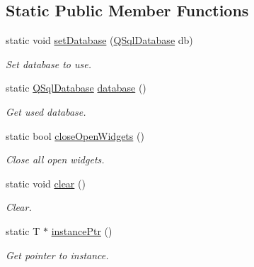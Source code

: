 \subsection*{Static Public Member Functions}
\begin{DoxyCompactItemize}
\item 
static void \hyperlink{classmdt_sql_application_widgets_affa03f524f089c58627adaf009b34333}{set\-Database} (\hyperlink{class_q_sql_database}{Q\-Sql\-Database} db)
\begin{DoxyCompactList}\small\item\em Set database to use. \end{DoxyCompactList}\item 
static \hyperlink{class_q_sql_database}{Q\-Sql\-Database} \hyperlink{classmdt_sql_application_widgets_a0eadaf7f2fdc32ef0b5e8a2cb0954126}{database} ()
\begin{DoxyCompactList}\small\item\em Get used database. \end{DoxyCompactList}\item 
static bool \hyperlink{classmdt_sql_application_widgets_a8084af5be11b7660a007e1d784252877}{close\-Open\-Widgets} ()
\begin{DoxyCompactList}\small\item\em Close all open widgets. \end{DoxyCompactList}\item 
static void \hyperlink{classmdt_sql_application_widgets_a14b5eb0dbed81a229ac49d1aa4e4db91}{clear} ()
\begin{DoxyCompactList}\small\item\em Clear. \end{DoxyCompactList}\item 
static T $\ast$ \hyperlink{classmdt_sql_application_widgets_acfa7123fb0d8ca57e75807ab20eed02e}{instance\-Ptr} ()
\begin{DoxyCompactList}\small\item\em Get pointer to instance. \end{DoxyCompactList}\end{DoxyCompactItemize}
